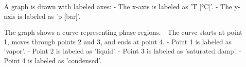 A graph is drawn with labeled axes:  
- The x-axis is labeled as 'T [°C]'.  
- The y-axis is labeled as 'p [bar]'.  

The graph shows a curve representing phase regions.  
- The curve starts at point 1, moves through points 2 and 3, and ends at point 4.  
- Point 1 is labeled as 'vapor'.  
- Point 2 is labeled as 'liquid'.  
- Point 3 is labeled as 'saturated damp'.  
- Point 4 is labeled as 'condensed'.